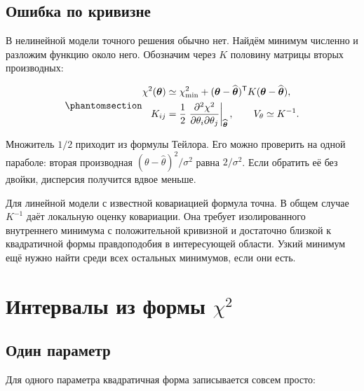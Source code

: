 \documentclass[
  russian,
  11pt,
  a4paper,
  open=any]{scrbook}
\begin{document}
\subsection{Ошибка по
кривизне}\label{ux43eux448ux438ux431ux43aux430-ux43fux43e-ux43aux440ux438ux432ux438ux437ux43dux435}

В нелинейной модели точного решения обычно нет. Найдём минимум численно
и разложим функцию около него. Обозначим через \(K\) половину матрицы
вторых производных:

\begin{equation}\protect\phantomsection\label{eq-ch12-curvature-covariance}{
\begin{aligned}
\chi^2(\boldsymbol\theta)
&\simeq\chi^2_{\min}
+(\boldsymbol\theta-\widehat{\boldsymbol\theta})^{\mathsf T}
K(\boldsymbol\theta-\widehat{\boldsymbol\theta}),\\
K_{ij}&=\frac12\left.
\frac{\partial^2\chi^2}{\partial\theta_i\partial\theta_j}
\right|_{\widehat{\boldsymbol\theta}},
\qquad V_\theta\simeq K^{-1}.
\end{aligned}
}\end{equation}

Множитель \(1/2\) приходит из формулы Тейлора. Его можно проверить на
одной параболе: вторая производная
\((\theta-\widehat\theta)^2/\sigma^2\) равна \(2/\sigma^2\). Если
обратить её без двойки, дисперсия получится вдвое меньше.

Для линейной модели с известной ковариацией формула точна. В общем
случае \(K^{-1}\) даёт локальную оценку ковариации. Она требует
изолированного внутреннего минимума с положительной кривизной и
достаточно близкой к квадратичной формы правдоподобия в интересующей
области. Узкий минимум ещё нужно найти среди всех остальных минимумов,
если они есть.

\section{\texorpdfstring{Интервалы из формы
\(\chi^2\)}{Интервалы из формы \textbackslash chi\^{}2}}\label{ux438ux43dux442ux435ux440ux432ux430ux43bux44b-ux438ux437-ux444ux43eux440ux43cux44b-chi2}

\subsection{Один параметр}\label{interactive-least-squares-delta-chi2}

Для одного параметра квадратичная форма записывается совсем просто:
\end{document}
